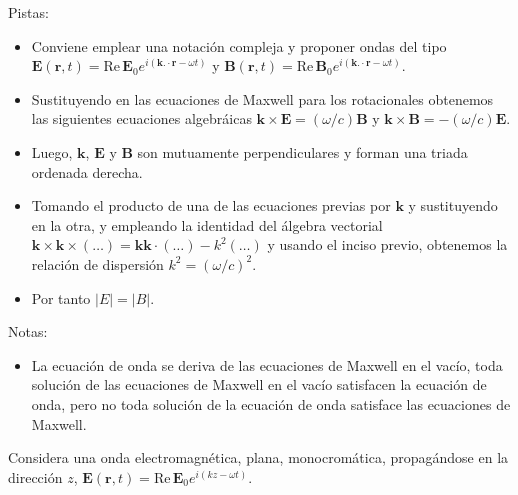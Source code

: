 \documentclass{exam}
\begin{document}
\begin{questions}
  Pistas:
  \begin{itemize}
  \item Conviene emplear una notación compleja y proponer ondas del
    tipo $\bm E(\bm r,t)=\text{Re}\, \bm E_0 e^{i(\bm k.\cdot\bm
      r-\omega t)}$ y $\bm B(\bm r,t)=\text{Re}\, \bm B_0 e^{i(\bm k.\cdot\bm
      r-\omega t)}$.
  \item Sustituyendo en las ecuaciones de Maxwell para los
    rotacionales obtenemos las siguientes ecuaciones algebráicas
    $\bm k\times \bm E=(\omega/c)\bm B$ y
    $\bm k\times \bm B=-(\omega/c)\bm E$.
  \item Luego, $\bm k$, $\bm E$ y $\bm B$ son mutuamente
    perpendiculares y forman una triada ordenada derecha.
  \item Tomando el producto de una de las ecuaciones previas por $\bm
    k$ y sustituyendo en la otra, y empleando la identidad del álgebra
    vectorial $\bm k\times\bm k\times(\ldots)=\bm k\bm
    k\cdot(\ldots)-k^2(\ldots)$ y usando el inciso previo, obtenemos la
    relación de dispersión $k^2=(\omega/c)^2$.
  \item Por tanto $|E|=|B|$.
  \end{itemize}

 Notas:
 \begin{itemize}
 \item La ecuación de onda se deriva de las ecuaciones de Maxwell en
   el vacío, toda solución de las ecuaciones de Maxwell en el vacío
   satisfacen la ecuación de onda, pero no toda solución de la
   ecuación de onda satisface las ecuaciones de Maxwell.
 \end{itemize}

\question\label{23} Considera una onda electromagnética, plana,
  monocromática, propagándose
  en la dirección $z$, $\bm E(\bm r,t)=\text{Re}\,\bm E_0 e^{i(kz-\omega t)}$.
\end{questions}
\end{document}
